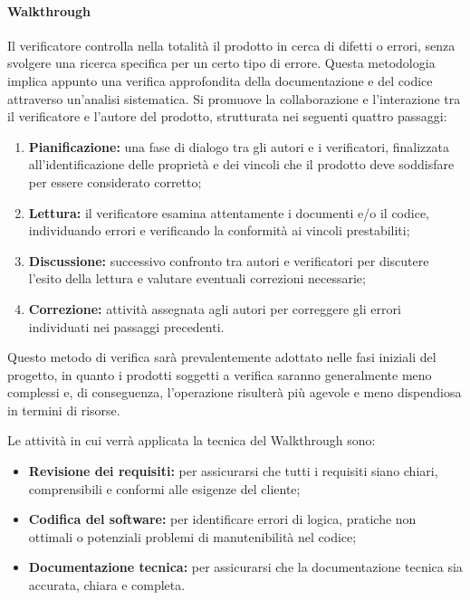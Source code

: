 \paragraph{Walkthrough}
Il verificatore controlla nella totalità il prodotto in cerca di difetti o errori, senza svolgere una ricerca specifica per un certo tipo di errore. Questa metodologia implica appunto una verifica approfondita della documentazione e del codice attraverso un'analisi sistematica. Si promuove la collaborazione e l'interazione tra il verificatore e l'autore del prodotto, strutturata nei seguenti quattro passaggi:

\begin{enumerate}
    \item \textbf{Pianificazione:} 
        una fase di dialogo tra gli autori e i verificatori, finalizzata all'identificazione delle proprietà e dei vincoli che il prodotto deve soddisfare per essere considerato corretto;

    \item \textbf{Lettura:} 
        il verificatore esamina attentamente i documenti e/o il codice, individuando errori e verificando la conformità ai vincoli prestabiliti;

    \item \textbf{Discussione:} 
        successivo confronto tra autori e verificatori per discutere l'esito della lettura e valutare eventuali correzioni necessarie;

    \item \textbf{Correzione:} 
        attività assegnata agli autori per correggere gli errori individuati nei passaggi precedenti.
\end{enumerate}

Questo metodo di verifica sarà prevalentemente adottato nelle fasi iniziali del progetto, in quanto i prodotti soggetti a verifica saranno generalmente meno complessi e, di conseguenza, l'operazione risulterà più agevole e meno dispendiosa in termini di risorse.

Le attività in cui verrà applicata la tecnica del Walkthrough sono:
\begin{itemize}
    \item \textbf{Revisione dei requisiti:} 
        per assicurarsi che tutti i requisiti siano chiari, comprensibili e conformi alle esigenze del cliente;
    \item \textbf{Codifica del software:} 
        per identificare errori di logica, pratiche non ottimali o potenziali problemi di manutenibilità nel codice;
    \item \textbf{Documentazione tecnica:} 
        per assicurarsi che la documentazione tecnica sia accurata, chiara e completa.
\end{itemize}


